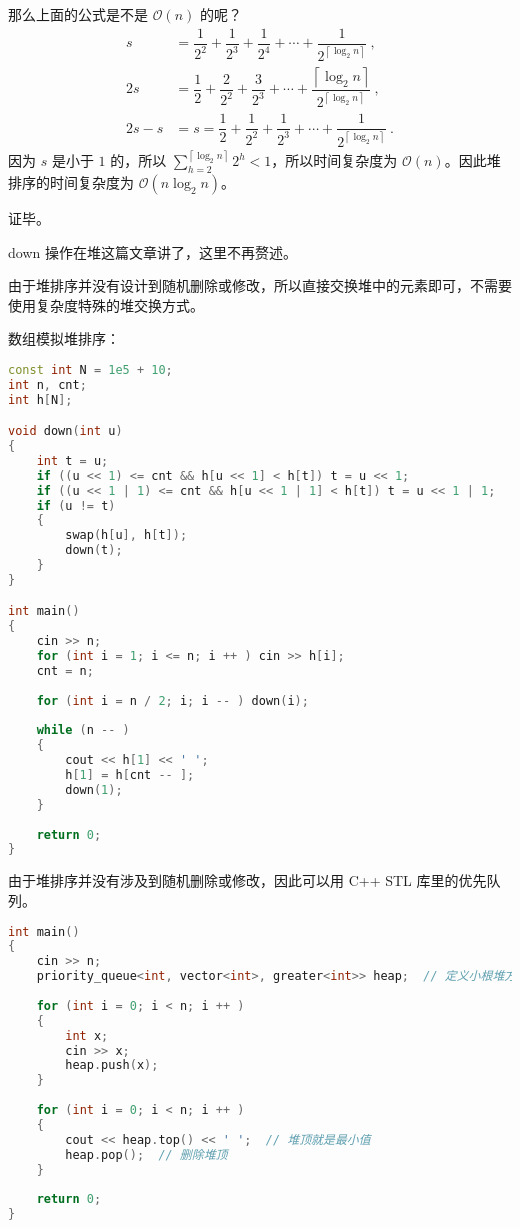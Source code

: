 那么上面的公式是不是 $\mathcal{O}(n)$ 的呢？
\begin{equation}
\begin{aligned}
s &= \dfrac{1}{2^2} + \dfrac{1}{2^3} + \dfrac{1}{2^4} + \cdots +\dfrac{1}{2^{\left\lceil{\log_2 n}\right\rceil}}~,\\
2s &= \dfrac{1}{2} + \dfrac{2}{2^2} + \dfrac{3}{2^3} + \cdots + \dfrac{\left\lceil{\log_2 n}\right\rceil}{2^{\left\lceil{\log_2 n}\right\rceil}}~,\\
2s - s &= s= \dfrac{1}{2} + \dfrac{1}{2^2} + \dfrac{1}{2^3} + \cdots + \dfrac{1}{2^{\left\lceil{\log_2 n}\right\rceil}}~.
\end{aligned}
\end{equation}
因为 $s$ 是小于 $1$ 的，所以 $\sum^{\left\lceil{\log_2 n}\right\rceil} _ {h = 2} 2^h < 1$，所以时间复杂度为 $\mathcal{O}(n)$。因此堆排序的时间复杂度为 $\mathcal{O}(n \log_2 n)$。

证毕。

down 操作在堆这篇文章讲了，这里不再赘述。

 由于堆排序并没有设计到随机删除或修改，所以直接交换堆中的元素即可，不需要使用复杂度特殊的堆交换方式。

数组模拟堆排序：
\begin{lstlisting}[language=cpp]
const int N = 1e5 + 10;
int n, cnt;
int h[N];

void down(int u)
{
    int t = u;
    if ((u << 1) <= cnt && h[u << 1] < h[t]) t = u << 1;
    if ((u << 1 | 1) <= cnt && h[u << 1 | 1] < h[t]) t = u << 1 | 1;
    if (u != t)
    {
        swap(h[u], h[t]);
        down(t);
    }
}

int main()
{
    cin >> n;
    for (int i = 1; i <= n; i ++ ) cin >> h[i];
    cnt = n;
    
    for (int i = n / 2; i; i -- ) down(i);
    
    while (n -- )
    {
        cout << h[1] << ' ';
        h[1] = h[cnt -- ];
        down(1);
    }
    
    return 0;
}
\end{lstlisting}

由于堆排序并没有涉及到随机删除或修改，因此可以用 C++ STL 库里的优先队列。

\begin{lstlisting}[language=cpp]
int main()
{
    cin >> n;
    priority_queue<int, vector<int>, greater<int>> heap;  // 定义小根堆方式
    
    for (int i = 0; i < n; i ++ )
    {
        int x;
        cin >> x;
        heap.push(x);
    }
    
    for (int i = 0; i < n; i ++ )
    {
        cout << heap.top() << ' ';  // 堆顶就是最小值
        heap.pop();  // 删除堆顶
    }
    
    return 0;
}
\end{lstlisting}